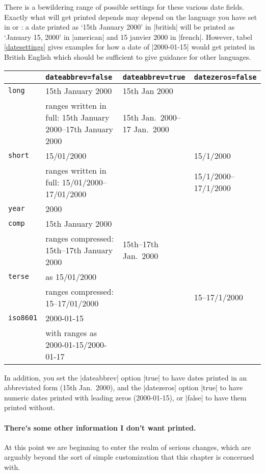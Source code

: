 There is a bewildering range of possible settings for these various date fields. Exactly what will get printed depends may depend on the language you have set in  or : a date printed as `15th January 2000' in |british| will be printed as `January 15, 2000' in |american| and 15 janvier 2000 in |french|. However, tabel \ref{datesettings} gives examples for how a date of |2000-01-15| would get printed in British English which should be sufficient to give guidance for other languages.
\begin{table*}
\begin{tabular}{lp{2.8in}lp{1in}}
\toprule
& \texttt{dateabbrev=false} & \texttt{dateabbrev=true} & \texttt{datezeros=false} \\
\midrule\texttt{long} & 15th January 2000 & 15th Jan 2000 \\
& ranges written in full: 15th January 2000--17th January 2000 & 15th Jan.\ 2000--17 Jan.\ 2000\\
\texttt{short} & 15/01/2000 & & 15/1/2000\\
& ranges written in full: 15/01/2000--17/01/2000 & &15/1/2000--17/1/2000 \\
\texttt{year} & 2000 \\
\texttt{comp} & 15th January 2000 \\
& ranges compressed: 15th--17th January 2000 & 15th--17th Jan.\ 2000 \\
\texttt{terse} & as 15/01/2000 \\
& ranges compressed: 15--17/01/2000 & & 15--17/1/2000\\
\texttt{iso8601} & 2000-01-15 \\
& with ranges as 2000-01-15/2000-01-17 \\
\bottomrule
\end{tabular}
\caption{Various date settings\label{datesettings}}
\end{table*}
In addition, you set the |dateabbrev| option |true| to have dates printed in an abbreviated form (15th Jan.\ 2000), and the |datezeros| option |true| to have numeric dates printed with leading zeros (2000-01-15), or |false| to have them printed without.

\paragraph{There's some other information I don't want printed.} At this point we are beginning to enter the realm of serious changes, which are arguably beyond the sort of simple customization that this chapter is concerned with.

